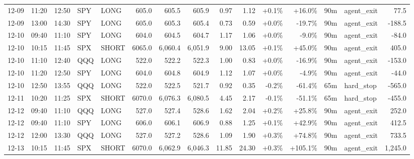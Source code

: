 \documentclass[11pt,a4paper,twoside]{article}
\begin{document}
\begin{landscape}
\begin{center}
\begin{longtable}{>{\color{txtmain}}l l l l l r r r r r r r r >{\color{txtmain}}l r}
12-09 & 11:20 & 12:50 & SPY & LONG & 605.0 & 605.5 & 605.9 & 0.97 & 1.12 & \textcolor{wingreen}{+0.1\%} & \textcolor{wingreen}{+16.0\%} & 90m & agent\_exit & \textcolor{wingreen}{77.5} \\
12-09 & 13:00 & 14:30 & SPY & LONG & 605.0 & 605.3 & 605.4 & 0.73 & 0.59 & \textcolor{wingreen}{+0.0\%} & \textcolor{lossred}{-19.7\%} & 90m & agent\_exit & \textcolor{lossred}{-188.5} \\
12-10 & 09:40 & 11:10 & SPY & LONG & 604.0 & 604.5 & 604.7 & 1.17 & 1.06 & \textcolor{wingreen}{+0.0\%} & \textcolor{lossred}{-9.0\%} & 90m & agent\_exit & \textcolor{lossred}{-84.0} \\
12-10 & 10:15 & 11:45 & SPX & SHORT & 6065.0 & 6,060.4 & 6,051.9 & 9.00 & 13.05 & \textcolor{wingreen}{+0.1\%} & \textcolor{wingreen}{+45.0\%} & 90m & agent\_exit & \textcolor{wingreen}{405.0} \\
12-10 & 11:10 & 12:40 & QQQ & LONG & 522.0 & 522.2 & 522.3 & 1.00 & 0.83 & \textcolor{wingreen}{+0.0\%} & \textcolor{lossred}{-16.9\%} & 90m & agent\_exit & \textcolor{lossred}{-153.0} \\
12-10 & 11:20 & 12:50 & SPY & LONG & 604.0 & 604.8 & 604.9 & 1.12 & 1.07 & \textcolor{wingreen}{+0.0\%} & \textcolor{lossred}{-4.9\%} & 90m & agent\_exit & \textcolor{lossred}{-44.0} \\
12-10 & 12:50 & 13:55 & QQQ & LONG & 522.0 & 522.5 & 521.7 & 0.92 & 0.35 & \textcolor{lossred}{-0.2\%} & \textcolor{lossred}{-61.4\%} & 65m & hard\_stop & \textcolor{lossred}{-565.0} \\
12-11 & 10:20 & 11:25 & SPX & SHORT & 6070.0 & 6,076.3 & 6,080.5 & 4.45 & 2.17 & \textcolor{lossred}{-0.1\%} & \textcolor{lossred}{-51.1\%} & 65m & hard\_stop & \textcolor{lossred}{-455.0} \\
12-12 & 09:40 & 11:10 & QQQ & LONG & 527.0 & 527.4 & 528.6 & 1.62 & 2.04 & \textcolor{wingreen}{+0.2\%} & \textcolor{wingreen}{+25.8\%} & 90m & agent\_exit & \textcolor{wingreen}{252.0} \\
12-12 & 09:40 & 11:10 & SPY & LONG & 606.0 & 606.1 & 606.9 & 0.88 & 1.25 & \textcolor{wingreen}{+0.1\%} & \textcolor{wingreen}{+42.9\%} & 90m & agent\_exit & \textcolor{wingreen}{412.5} \\
12-12 & 12:00 & 13:30 & QQQ & LONG & 527.0 & 527.2 & 528.6 & 1.09 & 1.90 & \textcolor{wingreen}{+0.3\%} & \textcolor{wingreen}{+74.8\%} & 90m & agent\_exit & \textcolor{wingreen}{733.5} \\
12-13 & 10:15 & 11:45 & SPX & SHORT & 6070.0 & 6,062.9 & 6,046.3 & 11.85 & 24.30 & \textcolor{wingreen}{+0.3\%} & \textcolor{wingreen}{+105.1\%} & 90m & agent\_exit & \textcolor{wingreen}{1,245.0} \\

\end{longtable}
\end{center}
\end{landscape}
\end{document}
